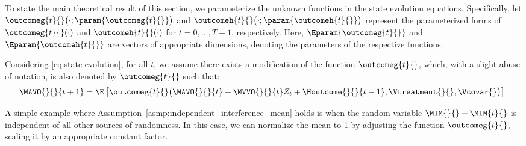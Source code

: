 To state the main theoretical result of this section, we parameterize the unknown functions in the state evolution equations. Specifically, let $\outcomeg{t}{}\big(\cdot; \param{\outcomeg{t}{}}\big)$ and $\outcomeh{t}{}\big(\cdot; \param{\outcomeh{t}{}}\big)$ represent the parameterized forms of $\outcomeg{t}{}(\cdot)$ and $\outcomeh{t}{}(\cdot)$ for $t = 0, \ldots, T-1$, respectively. Here, $\Eparam{\outcomeg{t}{}}$ and $\Eparam{\outcomeh{t}{}}$ are vectors of appropriate dimensions, denoting the parameters of the respective functions. 
% 
\begin{assumption}
    \label{asmp:independent_interference_mean}
    Considering \eqref{eq:state evolution}, for all $t$, we assume there exists a modification of the function $\outcomeg{t}{}$, which, with a slight abuse of notation, is also denoted by $\outcomeg{t}{}$ such that:
    \begin{align}
    \label{eq:independent_interference_mean}
        \MAVO{}{}{t+1} =
        \E\left[
        \outcomeg{t}{}\big(\MAVO{}{}{t} + \MVVO{}{}{t} Z_t + \Houtcome{}{}{t-1}, \Vtreatment{}{}, \Vcovar{}\big)
        \right].
    \end{align}
\end{assumption}
% 
A simple example where Assumption~\ref{asmp:independent_interference_mean} holds is when the random variable $\MIM{}{} + \MIM{t}{}$ is independent of all other sources of randomness. In this case, we can normalize the mean to 1 by adjusting the function $\outcomeg{t}{}$, scaling it by an appropriate constant factor.

